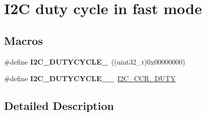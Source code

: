\hypertarget{group___i2_c__duty__cycle__in__fast__mode}{}\section{I2C duty cycle in fast mode}
\label{group___i2_c__duty__cycle__in__fast__mode}
\subsection*{Macros}
\begin{DoxyCompactItemize}
\item 
\#define {\bfseries I2\+C\+\_\+\+D\+U\+T\+Y\+C\+Y\+C\+L\+E\+\_}~((uint32\+\_\+t)0x00000000)\hypertarget{group___i2_c__duty__cycle__in__fast__mode_ga414df076d339793a7c761033346fd4ca}{}\label{group___i2_c__duty__cycle__in__fast__mode_ga414df076d339793a7c761033346fd4ca}

\item 
\#define {\bfseries I2\+C\+\_\+\+D\+U\+T\+Y\+C\+Y\+C\+L\+E\+\_\+\_}~\hyperlink{group___peripheral___registers___bits___definition_ga851c8a6b598d54c1a805b1632a4078e5}{I2\+C\+\_\+\+C\+C\+R\+\_\+\+D\+U\+TY}\hypertarget{group___i2_c__duty__cycle__in__fast__mode_gae9d1f8a140f052c1fcbcd87b4181f78d}{}\label{group___i2_c__duty__cycle__in__fast__mode_gae9d1f8a140f052c1fcbcd87b4181f78d}

\end{DoxyCompactItemize}


\subsection{Detailed Description}
